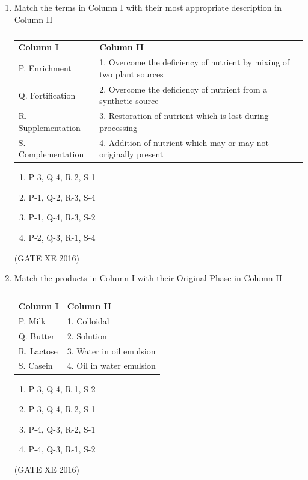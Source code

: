\documentclass[12pt]{article}
\begin{document}
\begin{enumerate}
\item Match the terms in Column I with their most appropriate description in Column II \\
\begin{table}[h]
\centering
\begin{tabular}{ll}
\textbf{Column I} & \textbf{Column II} \\
P. Enrichment & 1. Overcome the deficiency of nutrient by mixing of two plant sources \\
Q. Fortification & 2. Overcome the deficiency of nutrient from a synthetic source \\
R. Supplementation & 3. Restoration of nutrient which is lost during processing \\
S. Complementation & 4. Addition of nutrient which may or may not originally present \\
\end{tabular}
\caption{}
\label{}
\end{table}
\begin{multicols}{2}
\begin{enumerate}
\item P-3, Q-4, R-2, S-1
\item P-1, Q-2, R-3, S-4
\item P-1, Q-4, R-3, S-2
\item P-2, Q-3, R-1, S-4
\end{enumerate}
\end{multicols}
(GATE XE 2016)

\item Match the products in Column I with their Original Phase in Column II \\
\begin{table}[h]
\centering
\begin{tabular}{ll}
\textbf{Column I} & \textbf{Column II} \\
P. Milk & 1. Colloidal \\
Q. Butter & 2. Solution \\
R. Lactose & 3. Water in oil emulsion \\
S. Casein & 4. Oil in water emulsion \\
\end{tabular}
\caption{}
\label{}
\end{table}
\begin{multicols}{2}
\begin{enumerate}
\item P-3, Q-4, R-1, S-2
\item P-3, Q-4, R-2, S-1
\item P-4, Q-3, R-2, S-1
\item P-4, Q-3, R-1, S-2
\end{enumerate}
\end{multicols}
(GATE XE 2016)


\end{enumerate}
\end{document}
